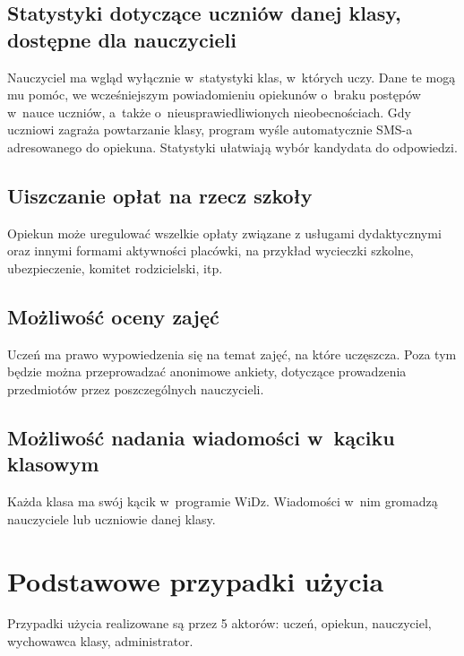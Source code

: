 \documentclass[12pt,leqno,twoside]{mwart}
\begin{document}
\subsection{Statystyki dotyczące uczniów danej klasy, dostępne dla nauczycieli}
\noindent Nauczyciel ma wgląd wyłącznie w~statystyki klas, w~których uczy. Dane te mogą mu pomóc, we wcześniejszym powiadomieniu opiekunów o~braku postępów w~nauce uczniów, a~także o~nieusprawiedliwionych nieobecnościach. Gdy uczniowi zagraża powtarzanie klasy, program wyśle automatycznie SMS-a adresowanego do opiekuna. Statystyki ułatwiają wybór kandydata do odpowiedzi.
\subsection{Uiszczanie opłat na rzecz szkoły}
\noindent Opiekun może uregulować wszelkie opłaty związane z usługami dydaktycznymi oraz innymi formami aktywności placówki, na przykład wycieczki szkolne, ubezpieczenie, komitet rodzicielski, itp.
\subsection{Możliwość oceny zajęć}
\noindent Uczeń ma prawo wypowiedzenia się na temat zajęć, na które uczęszcza. Poza tym będzie można przeprowadzać anonimowe ankiety, dotyczące prowadzenia przedmiotów przez poszczególnych nauczycieli.
\subsection{Możliwość nadania wiadomości w~kąciku klasowym}
\noindent Każda klasa ma swój kącik w~programie WiDz. Wiadomości w~nim gromadzą nauczyciele lub uczniowie danej klasy.

\section{Podstawowe przypadki użycia}
\noindent Przypadki użycia realizowane są przez 5 aktorów: uczeń, opiekun, nauczyciel, wychowawca klasy, administrator.
\end{document}
